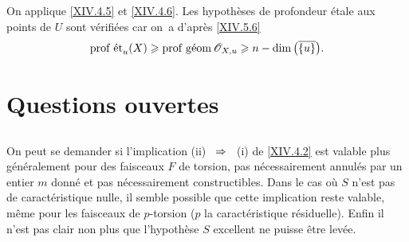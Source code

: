 On applique \ref{XIV.4.5} et \ref{XIV.4.6}. Les hypoth\`eses de profondeur \'etale aux points de $U$ sont v\'erifi\'ees car on~a d'apr\`es \ref{XIV.5.6} $$
\operatorname{prof\;\acute{e}t}_{u}(X)\geqslant\operatorname{prof\;g\acute{e}om}{\mathscr O}_{X, u}\geqslant n-\dim\big(\overline{\{ u\} }\big).
$$

\enlargethispage{\baselineskip}%
\section{Questions ouvertes} \label{XIV.6}

\subsection{} \label{XIV.6.1} On peut se demander si l'implication \textup{(ii)} ~$\To$~ \textup{(i)} de \ref{XIV.4.2} est valable plus g\'en\'eralement pour des faisceaux $F$ de torsion, pas n\'ecessairement annul\'es par un entier $m$ donn\'e et pas n\'ecessairement constructibles. Dans le cas o\`u $S$ n'est pas de caract\'eristique nulle, il semble possible que cette implication reste valable, m\^eme pour les faisceaux de $p$-torsion ($p$ la caract\'eristique r\'esiduelle). Enfin il n'est pas clair non plus que l'hypoth\`ese $S$ excellent ne puisse \^etre lev\'ee.

